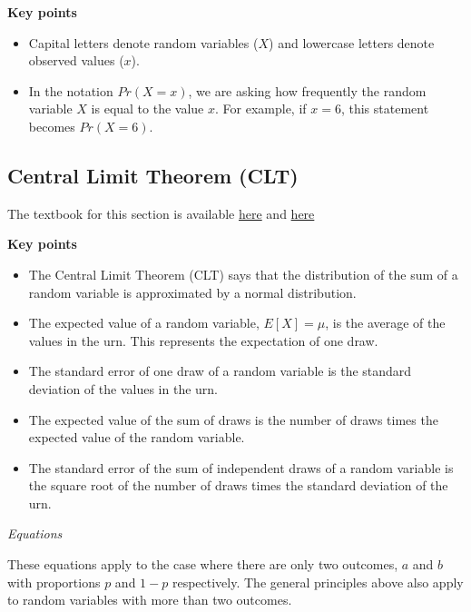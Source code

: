 \documentclass[
]{article}
\providecommand{\tightlist}{%
  \setlength{\itemsep}{0pt}\setlength{\parskip}{0pt}}
\begin{document}
\textbf{Key points}

\begin{itemize}
\tightlist
\item
  Capital letters denote random variables (\(X\)) and lowercase letters
  denote observed values (\(x\)).
\item
  In the notation \(Pr(X = x)\), we are asking how frequently the random
  variable \(X\) is equal to the value \(x\). For example, if \(x = 6\),
  this statement becomes \(Pr(X = 6)\).
\end{itemize}

\hypertarget{central-limit-theorem-clt}{%
\subsection{Central Limit Theorem
(CLT)}\label{central-limit-theorem-clt}}

The textbook for this section is available
\href{https://rafalab.github.io/dsbook/random-variables.html\#the-expected-value-and-standard-error}{here}
and
\href{https://rafalab.github.io/dsbook/random-variables.html\#central-limit-theorem}{here}

\textbf{Key points}

\begin{itemize}
\tightlist
\item
  The Central Limit Theorem (CLT) says that the distribution of the sum
  of a random variable is approximated by a normal distribution.
\item
  The expected value of a random variable,
  \(E \left [ X \right] = \mu\), is the average of the values in the
  urn. This represents the expectation of one draw.
\item
  The standard error of one draw of a random variable is the standard
  deviation of the values in the urn.
\item
  The expected value of the sum of draws is the number of draws times
  the expected value of the random variable.
\item
  The standard error of the sum of independent draws of a random
  variable is the square root of the number of draws times the standard
  deviation of the urn.
\end{itemize}

\emph{Equations}

These equations apply to the case where there are only two outcomes,
\(a\) and \(b\) with proportions \(p\) and \(1-p\) respectively. The
general principles above also apply to random variables with more than
two outcomes.
\end{document}
